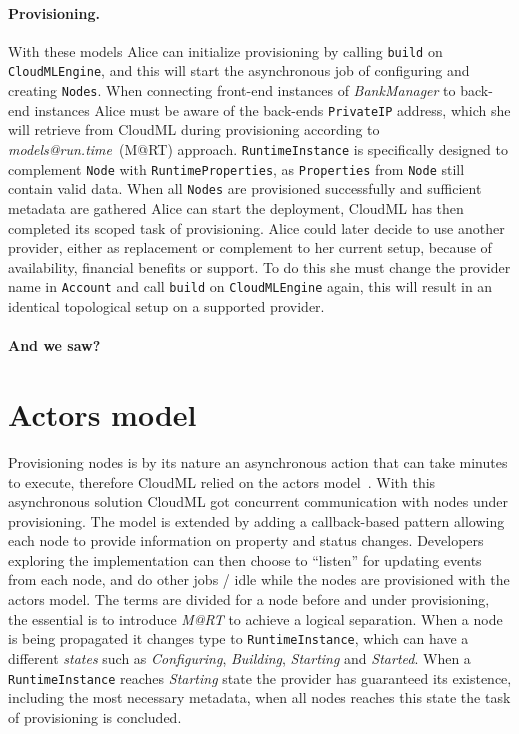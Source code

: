\paragraph{Provisioning.}
With these models Alice can initialize provisioning by calling 
\texttt{build} on \texttt{CloudMLEngine},
and this will start the asynchronous job of configuring and creating \texttt{Nodes}.
When connecting front-end instances of \emph{BankManager} to back-end instances Alice must 
be aware of the back-ends \texttt{PrivateIP} address, which she will retrieve from CloudML
during provisioning according to \emph{models@run.time}~(M@RT) approach.
\texttt{RuntimeInstance} is specifically designed to complement \texttt{Node} with \texttt{RuntimeProperties},
as \texttt{Properties} from \texttt{Node} still contain valid data.
When all \texttt{Nodes} are provisioned successfully and sufficient metadata are gathered
Alice can start the deployment, CloudML has then completed its scoped task of provisioning.
Alice could later decide to use another provider, either as replacement or complement to her current setup,
because of availability, financial benefits or support.
To do this she must change the provider name in \texttt{Account} and call \texttt{build} on \texttt{CloudMLEngine} again,
this will result in an identical topological setup on a supported provider.

\paragraph{And we saw?}

\section{Actors model}
Provisioning nodes is by its nature an asynchronous action that can take minutes to execute,
therefore CloudML relied on the actors model~\cite{actors:haller07}.
With this asynchronous solution CloudML got concurrent communication with nodes under provisioning.
The model is extended by adding a callback-based pattern allowing each node to provide 
information on property and status changes.
Developers exploring the implementation can then choose to ``listen'' for updating events from each node,
and do other jobs / idle while the nodes are provisioned with the actors model.
The terms are divided for a node before and under provisioning, the essential is to introduce 
\emph{M@RT} to achieve a logical separation.
When a node is being propagated it changes type to \texttt{RuntimeInstance}, 
which can have a different \emph{states} such as \emph{Configuring}, \emph{Building}, \emph{Starting} and \emph{Started}.
When a \texttt{RuntimeInstance} reaches \emph{Starting} state the provider has guaranteed its existence, including
the most necessary metadata, when all nodes reaches this state the task of provisioning is concluded.
